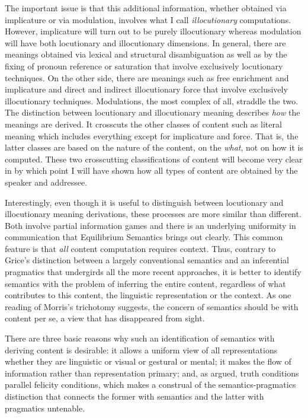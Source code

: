 The important issue is that this additional information, whether obtained via implicature or via modulation, involves what I call \emph{illocutionary} computations. However, implicature will turn out to be purely illocutionary whereas modulation will have both locutionary and illocutionary dimensions. In general, there are meanings obtained via lexical and structural disambiguation as well as by the fixing of pronoun reference or saturation that involve exclusively locutionary techniques. On the other side, there are meanings such as free enrichment and implicature and direct and indirect illocutionary force that involve exclusively illocutionary techniques. Modulations, the most complex of all, straddle the two. The distinction between locutionary and illocutionary meaning describes \emph{how} the meanings are derived. It crosscuts the other classes of content such as literal meaning which includes everything except for implicature and force. That is, the latter classes are based on the nature of the content, on the \emph{what}, not on how it is computed. These two crosscutting classifications of content will become very clear in  by which point I will have shown how all types of content are obtained by the speaker and addressee.

Interestingly, even though it is useful to distinguish between locutionary and illocutionary meaning derivations, these processes are more similar than different. Both involve partial information games and there is an underlying uniformity in communication that Equilibrium Semantics brings out clearly. This common feature is that \emph{all} content computation requires context. Thus, contrary to Grice's distinction between a largely conventional semantics and an inferential pragmatics that undergirds all the more recent approaches, it is better to identify semantics with the problem of inferring the entire content, regardless of what contributes to this content, the linguistic representation or the context. As one reading of Morris's trichotomy suggests, the concern of semantics should be with content per se, a view that has disappeared from sight. 

There are three basic reasons why such an identification of semantics with deriving content is desirable: it allows a uniform view of all representations whether they are linguistic or visual or gestural or mental; it makes the flow of information rather than representation primary; and, as \citet{austin:pu, austin:htdtww} argued, truth conditions parallel felicity conditions, which makes a construal of the semantics-pragmatics distinction that connects the former with semantics and the latter with pragmatics untenable.

